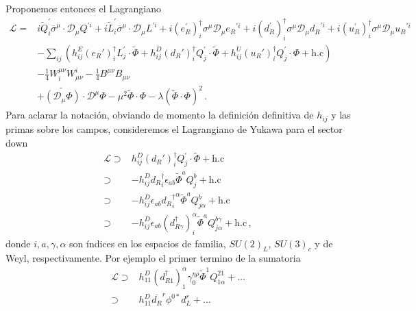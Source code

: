 \begin{frame}
Proponemos entonces el Lagrangiano
\begin{align}
\label{eq:265qft} 
    \mathcal{L}=&i \widetilde{Q}^{\prime}_i\overline{\sigma}^\mu\cdot \mathcal{D}_\mu Q^{\prime i}+i\widetilde{ L}^{\prime}_i\overline{\sigma}^\mu\cdot \mathcal{D}_\mu L^{\prime i}+
i\left( e_R^{\prime} \right)^{\dagger}_i\sigma^\mu\mathcal{D}_\mu {e_R}^{\prime i}+i(d_R^{\prime})^{\dagger}_i\sigma^\mu\mathcal{D}_\mu {d_R}^{\prime i}+i(u_R^{\prime})^{\dagger}_i\sigma^\mu\mathcal{D}_\mu {u_R}^{\prime i}
\nonumber\\
     &- \sum_{ij}\left( h_{ij}^E (e_R')^{\dagger}_i{L}^{\prime}_j\cdot \widetilde{\Phi}  
+h_{ij}^D (d_R')^{\dagger}_i{Q}^{\prime}_j\cdot \widetilde{\Phi}  
+h_{ij}^U(u_R')^{\dagger}_i Q^{\prime}_j\cdot \Phi+\text{h.c} \right)\nonumber\\
     &-\tfrac{1}{4}W^{\mu\nu}_i W_{\mu\nu}^i-\tfrac{1}{4}B^{\mu\nu} B_{\mu\nu}\nonumber\\
     &+\widetilde{\left( \mathcal{D}_\mu{\Phi} \right)}\cdot\mathcal{D}^\mu\Phi-\mu^2\widetilde{\Phi}\cdot\Phi-\lambda \left( \widetilde{\Phi}\cdot\Phi \right)^2\,.
\end{align}
Para aclarar la notación, obviando de momento la definición definitiva de $h_{ij}$ y las primas sobre los campos, consideremos el Lagrangiano de Yukawa para el sector down
\begin{align}
  \label{eq:264qft}
  \mathcal{L}\supset&h_{ij}^D (d_R')^{\dagger}_i{Q}^{\prime}_j\cdot \widetilde{\Phi}+\text{h.c}\nonumber\\
\supset&-h^D_{ij}{d_R}^{\dagger}_i\epsilon_{ab}\widetilde{\Phi}^aQ_j^b+\text{h.c}\nonumber\\
\supset&-h^D_{ij}\epsilon_{ab}{{d_R}^{\dagger}_i}^\alpha\widetilde{\Phi}^aQ_{j\alpha}^b+\text{h.c}\nonumber\\
\supset&-h^D_{ij}\epsilon_{ab}{(d_{R\gamma}^\dagger)}_i^\alpha\widetilde{\Phi}^aQ_{j\alpha}^{b\gamma}+\text{h.c}\,,
\end{align}
donde $i,a,\gamma,\alpha$ son índices en los espacios de familia, $SU(2)_L$, $SU(3)_c$ y de Weyl, respectivamente. Por ejemplo el primer termino de la sumatoria 
\begin{align}
\mathcal{L}\supset&h^D_{11}{(d_{R1}^\dagger)}_1^{\alpha}\gamma_0^{\eta\rho}\widetilde{\Phi}^1Q_{1\alpha}^{21}+\ldots\nonumber\\
\supset&h^D_{11}\overline{d_R}^r\phi^{0*}d_{L}^r+\ldots\,
\end{align}


\end{frame}
